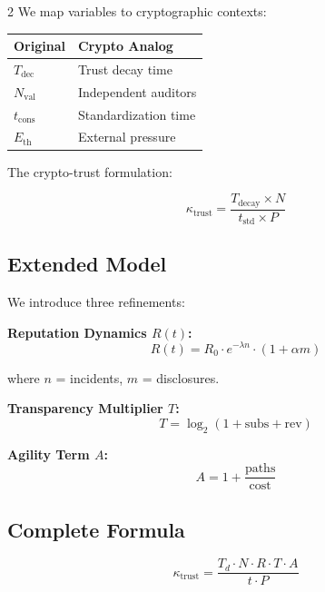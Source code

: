 \documentclass[11pt]{article}
\begin{document}
\begin{multicols}{2}
We map variables to cryptographic contexts:

\begin{center}
\small
\begin{tabular}{@{}ll@{}}
\toprule
\textbf{Original} & \textbf{Crypto Analog} \\
\midrule
$T_{\text{dec}}$ & Trust decay time \\
$N_{\text{val}}$ & Independent auditors \\
$t_{\text{cons}}$ & Standardization time \\
$E_{\text{th}}$ & External pressure \\
\bottomrule
\end{tabular}
\end{center}

The crypto-trust formulation:

\begin{equation}
\kappa_{\text{trust}} = \frac{T_{\text{decay}} \times N}{t_{\text{std}} \times P}
\end{equation}

\subsection{Extended Model}

We introduce three refinements:

\textbf{Reputation Dynamics $R(t)$:}
\begin{equation}
R(t) = R_0 \cdot e^{-\lambda n} \cdot (1 + \alpha m)
\end{equation}

where $n$ = incidents, $m$ = disclosures.

\textbf{Transparency Multiplier $T$:}
\begin{equation}
T = \log_2(1 + \text{subs} + \text{rev})
\end{equation}

\textbf{Agility Term $A$:}
\begin{equation}
A = 1 + \frac{\text{paths}}{\text{cost}}
\end{equation}

\subsection{Complete Formula}

\begin{equation}
\boxed{\kappa_{\text{trust}} = \frac{T_d \cdot N \cdot R \cdot T \cdot A}{t \cdot P}}
\end{equation}


\end{multicols}
\end{document}
